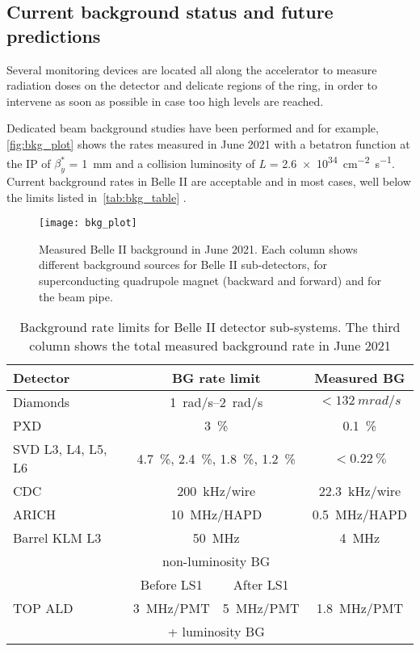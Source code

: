 \subsection{Current background status and future predictions}\label{sec:bkg_predictions}

Several monitoring devices are located all along the accelerator to measure radiation doses on the detector and delicate regions of the ring, in order to intervene as soon as possible in case too high levels are reached.

Dedicated beam background studies have been performed and for example, \autoref{fig:bkg_plot} shows the rates measured in June 2021 \cite{Natochii:2023thp} with a betatron function at the IP of $\beta_{y}^{*}$ = \SI{1}{mm} and a collision luminosity of \textit{L} = \SI{2.6e34}{cm^{-2} s^{-1}}. Current background rates in Belle II are acceptable and in most cases, well below the limits listed in~\autoref{tab:bkg_table} \cite{Natochii:2022vcs}.\\

\begin{figure}[h!]
\centering
\texttt{[image: bkg\_plot]}
\caption{Measured Belle II background in June 2021. Each column shows different background sources for Belle II sub-detectors, for superconducting quadrupole magnet (backward and forward) and for the beam pipe.}
\label{fig:bkg_plot}
\end{figure}


\begin{table}[htb]
\centering
    \begin{tabular}{lccc}
    \hline\hline
    Detector & \multicolumn{2}{c}{BG rate limit} & Measured BG\\
    \hline
    Diamonds & \multicolumn{2}{c}{\SIrange{1}{2}{rad/s}} & $<\SI{132}{mrad/s}$\\
    PXD & \multicolumn{2}{c}{\SI{3}{\%}} & \SI{0.1}{\%}\\
    SVD L3, L4, L5, L6 & \multicolumn{2}{c}{\SI{4.7}{\%}, \SI{2.4}{\%}, \SI{1.8}{\%}, \SI{1.2}{\%}} & $<\SI{0.22}{\%}$\\
    CDC & \multicolumn{2}{c}{\SI{200}{kHz/wire}} & \SI{22.3}{kHz/wire}\\
    ARICH & \multicolumn{2}{c}{\SI{10}{MHz/HAPD}} & \SI{0.5}{MHz/HAPD}\\
    Barrel KLM L3 & \multicolumn{2}{c}{\SI{50}{MHz}} & \SI{4}{MHz}\\
    & \multicolumn{2}{c}{non-luminosity BG} &\\\cline{2-3}
    & Before LS1 & After LS1 &\\\cline{2-3}
    TOP ALD & \SI{3}{MHz/PMT} & \SI{5}{MHz/PMT} & \SI{1.8}{MHz/PMT}\\
    & \multicolumn{2}{c}{+ luminosity BG} &\\
    \hline\hline
    \end{tabular}
    \caption{Background rate limits for Belle II detector sub-systems. The third column shows the total measured background rate in June 2021}
    \label{tab:bkg_table}
\end{table}


